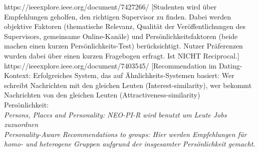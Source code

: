 \documentclass[nochapterpage,bigchapter,linedtoc,longdoc,colorback,accentcolor=tud3b,oneside]{tudreport}
\begin{document}
https://ieeexplore.ieee.org/document/7427266/ [Studenten wird über Empfehlungen geholfen, den richtigen Supervisor zu finden. Dabei werden objektive Faktoren (thematische Relevanz, Qualität der Veröffentlichungen des Supervisors, gemeinsame Online-Kanäle) und Persönlichkeitsfaktoren (beide machen einen kurzen Persönlichkeits-Test) berücksichtigt. Nutzer Präferenzen wurden dabei über einen kurzen Fragebogen erfragt. Ist NICHT Reciprocal.]\cite{zhang2016personality}\\

https://ieeexplore.ieee.org/document/7403545/  [Recommendation im Dating-Kontext: Erfolgreiches System, das auf Ähnlichkeits-Systemen basiert: Wer schreibt Nachrichten mit den gleichen Leuten (Interest-similarity), wer bekommt Nachrichten von den gleichen Leuten (Attractiveness-similarity) \cite{xia2015reciprocal}\\

Persönlichkeit:\\

\textit{Persons, Places and Personality: NEO-PI-R wird benutzt um Leute Jobs zuzuordnen \cite{costa1995persons}}\\

\textit{Personality-Aware Recommendations to groups: Hier werden Empfehlungen für homo- und heterogene Gruppen aufgrund der insgesamter Persönlichkeit gemacht. \cite{recio2009personality}}\\





\end{document}
